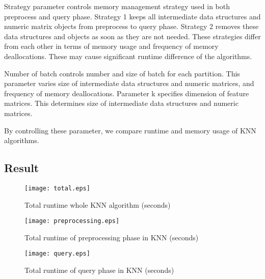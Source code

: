 Strategy parameter controls memory management strategy used in both preprocess and query phase.
Strategy 1 keeps all intermediate data structures and numeric matrix objects from preprocess to query phase. 
Strategy 2 removes these data structures and objects as soon as they are not needed. 
These strategies differ from each other in terms of memory usage and frequency of memory deallocations.
These may cause significant runtime difference of the algorithms.

Number of batch controls number and size of batch for each partition. This parameter varies size of intermediate data structures and numeric matrices, and 
frequency of memory deallocations. Parameter k specifies dimension of feature matrices. This determines size of intermediate data structures and numeric matrices.

By controlling these parameter, we compare runtime and memory usage of KNN algorithms. 


\subsection{Result}
\label{sec:history}



\begin{figure}[htb]
    \texttt{[image: total.eps]}
    \caption{Total runtime whole KNN algorithm (seconds)}
    \label{fig:total}
\end{figure}

\begin{figure}[htb]
    \texttt{[image: preprocessing.eps]}
    \caption{Total runtime of preprocessing phase in KNN (seconds)}
    \label{fig:preprocess}
\end{figure}


\begin{figure}[htb]
    \texttt{[image: query.eps]}
    \caption{Total runtime of query phase in KNN (seconds)}
    \label{fig:query}
\end{figure}


